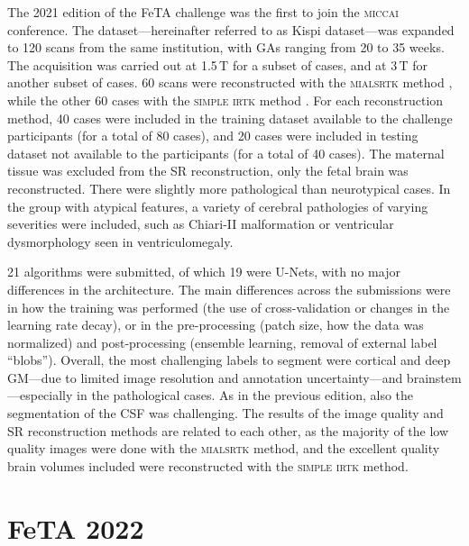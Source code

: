 The 2021 edition of the FeTA challenge \cite{FeTA2021_review, FeTA2021} was the first to join the \textsc{miccai} conference. The dataset---hereinafter referred to as Kispi dataset---was expanded to 120 scans from the same institution, with GAs ranging from 20 to 35 weeks. The acquisition was carried out at 1.5\,T for a subset of cases, and at 3\,T for another subset of cases. 60 scans were reconstructed with the \textsc{mialsrtk} method \cite{Tourbier2015, MIALSRTK}, while the other 60 cases with the \textsc{simple irtk} method \cite{Kuklisova2012, irtk-simple}. For each reconstruction method, 40 cases were included in the training dataset available to the challenge participants (for a total of 80 cases), and 20 cases were included in testing dataset not available to the participants (for a total of 40 cases). The maternal tissue was excluded from the SR reconstruction, only the fetal brain was reconstructed. There were slightly more pathological than neurotypical cases. In the group with atypical features, a variety of cerebral pathologies of varying severities were included, such as Chiari-II malformation or ventricular dysmorphology seen in ventriculomegaly.

21 algorithms were submitted, of which 19 were U-Nets, with no major differences in the architecture. The main differences across the submissions were in how the training was performed (the use of cross-validation or changes in the learning rate decay), or in the pre-processing (patch size, how the data was normalized) and post-processing (ensemble learning, removal of external label \enquote{blobs}). Overall, the most challenging labels to segment were cortical and deep GM---due to limited image resolution and annotation uncertainty---and brainstem---especially in the pathological cases. As in the previous edition, also the segmentation of the CSF was challenging. The results of the image quality and SR reconstruction methods are related to each other, as the majority of the low quality images were done with the \textsc{mialsrtk} method, and the excellent quality brain volumes included were reconstructed with the \textsc{simple irtk} method.

\section{FeTA 2022}

